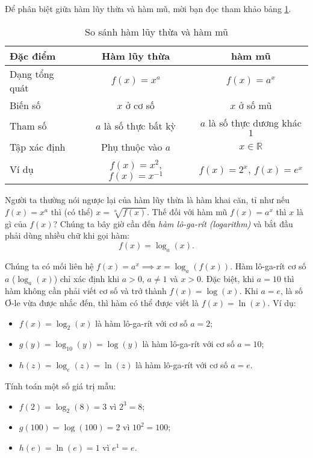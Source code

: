 \documentclass[a4paper, titlepage, openany]{book}
\begin{document}
Để phân biệt giữa hàm lũy thừa và hàm mũ, mời bạn đọc tham khảo bảng \ref{tab:bảng so sánh lũy thừa số mũ}.
\begin{table}[h]
\centering
\begin{tabular}{|l|c|c|}
\hline
\textbf{Đặc điểm} & \textbf{Hàm lũy thừa} & \textbf{hàm mũ} \\
\hline
Dạng tổng quát & $f(x) = x^a$ & $f(x) = a^x$ \\
\hline
Biến số & $x$ ở cơ số & $x$ ở số mũ \\
\hline
Tham số & $a$ là số thực bất kỳ & $a$ là số thực dương khác $1$\\
\hline
Tập xác định & Phụ thuộc vào $a$ & $x \in \mathbb{R}$ \\
\hline
Ví dụ & $f(x) = x^2$, $f(x) = x^{-1}$ & $f(x) = 2^x$, $f(x) = e^x$ \\
\hline
\end{tabular}
\caption{So sánh hàm lũy thừa và hàm mũ}
\label{tab:bảng so sánh lũy thừa số mũ}
\end{table}

Người ta thường nói ngược lại của hàm lũy thừa là hàm khai căn, tỉ như nếu $f(x) = x^a$ thì (có thể) $x = \sqrt[a]{f(x)}$. Thế đối với hàm mũ $f(x) = a^x$ thì $x$ là gì của $f(x)$? Chúng ta bây giờ cần đến \emph{hàm lô-ga-rít (logarithm)} và bắt đầu phải dùng nhiều chữ khi gọi hàm: $$f(x) = \log_a {\left(x\right)}.$$

Chúng ta có mối liên hệ $f(x) = a^x \implies x = \log_a {\left(f(x)\right)}$. Hàm lô-ga-rít cơ số $a$ ($\log_a {\left(x\right)}$) chỉ xác định khi $a > 0$, $a \neq 1$ và $x > 0$. Đặc biệt, khi $a = 10$ thì hàm không cần phải viết cơ số và trở thành $f(x) = \log(x)$. Khi $a = e$, là số Ơ-le vừa được nhắc đến, thì hàm có thể được viết là $f(x) = \ln(x)$. Ví dụ:
\begin{itemize}
   \item $f(x) = \log_2 (x)$ là hàm lô-ga-rít với cơ số $a = 2$;
   \item $g(y) = \log_{10} (y) = \log(y)$ là hàm lô-ga-rít với cơ số $a = 10$;
   \item $h(z) = \log_e (z)=\ln(z)$ là hàm lô-ga-rít với cơ số $a = e$.
\end{itemize}
Tính toán một số giá trị mẫu:
\begin{itemize}
   \item $f(2) = \log_2 (8) = 3$ vì $2^3 = 8$;
   \item $g(100) = \log (100) = 2$ vì $10^2 = 100$;
   \item $h(e) = \ln (e) = 1$ vì $e^1 = e$.
\end{itemize} 
\end{document}
